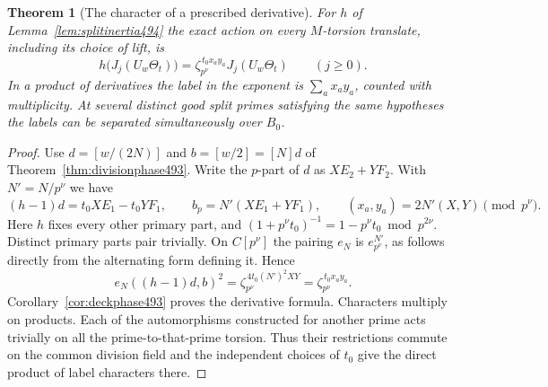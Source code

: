 \documentclass[a4paper,11pt]{article}
\newtheorem{theorem}[proposition]{Theorem}
\theoremstyle{definition}
\theoremstyle{remark}
\numberwithin{equation}{section}
\begin{document}
\begin{theorem}[The character of a prescribed derivative]\leavevmode
\label{thm:labelder494}
For \(h\) of Lemma~\ref{lem:splitinertia494} the exact action on
every \(M\)-torsion translate, including its choice of lift, is
\[
      h\big(J_j(U_w\Theta_t)\big)
          =\zeta_{p^\nu}^{\,t_0 x_a y_a}J_j(U_w\Theta_t)
                 \qquad(j\ge0).
\]
In a product of derivatives the label in the exponent is
\(\sum_a x_a y_a\), counted with multiplicity. At several
distinct good split primes satisfying the same hypotheses
the labels can be separated simultaneously over \(B_0\).
\end{theorem}
\begin{proof}
Use \(d=[w/(2N)]\) and \(b=[w/2]=[N]d\) of
Theorem~\ref{thm:divisionphase493}. Write the \(p\)-part of \(d\)
as \(X E_2+Y F_2\). With \(N'=N/p^\nu\) we have
\[
 (h-1)d=t_0X E_1-t_0Y F_1,\qquad
 b_p=N'(X E_1+Y F_1),\qquad
 (x_a,y_a)=2N'(X,Y)\pmod {p^\nu}.
\]
Here \(h\) fixes every other primary part, and
\((1+p^\nu t_0)^{-1}=1-p^\nu t_0\bmod p^{2\nu}\).
Distinct primary parts pair trivially. On \(C[p^\nu]\) the
pairing \(e_N\) is \(e_{p^\nu}^{N'}\), as follows directly from
the alternating form defining it. Hence
\[
 e_N((h-1)d,b)^2
   =\zeta_{p^\nu}^{\,4t_0(N')^2XY}
   =\zeta_{p^\nu}^{\,t_0x_a y_a}.
\]
Corollary~\ref{cor:deckphase493} proves the derivative formula.
Characters multiply on products. Each of the automorphisms
constructed for another prime acts trivially on all the
prime-to-that-prime torsion. Thus their restrictions commute on
the common division field and the independent choices of \(t_0\)
give the direct product of label characters there.
\end{proof}
\end{document}
